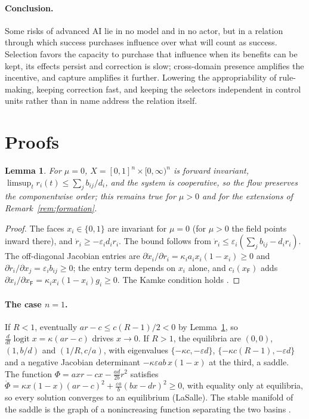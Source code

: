 \documentclass[letterpaper]{article} %
\newtheorem{lemma}{Lemma}
\theoremstyle{definition}
\newcommand{\dF}{\mathsf{F}}
\begin{document}
\paragraph{Conclusion.} Some risks of advanced AI lie in no model and in no actor, but in a relation through which success purchases influence over what will count as success. Selection favors the capacity to purchase that influence when its benefits can be kept, its effects persist and correction is slow; cross-domain presence amplifies the incentive, and capture amplifies it further. Lowering the appropriability of rule-making, keeping correction fast, and keeping the selectors independent in control units rather than in name address the relation itself.



\appendix

\section{Proofs}\label{app:proofs}

\begin{lemma}\label{lem:basic}
For $\mu=0$, $X=[0,1]^n\times[0,\infty)^n$ is forward invariant, $\limsup_t r_i(t)\le\sum_jb_{ij}/d_i$, and the system is cooperative, so the flow preserves the componentwise order; this remains true for $\mu>0$ and for the extensions of Remark~\ref{rem:formation}.
\end{lemma}
\begin{proof}
The faces $x_i\in\{0,1\}$ are invariant for $\mu=0$ (for $\mu>0$ the field points inward there), and $\dot r_i\ge-\varepsilon_id_ir_i$. The bound follows from $\dot r_i\le\varepsilon_i(\sum_jb_{ij}-d_ir_i)$. The off-diagonal Jacobian entries are $\partial\dot x_i/\partial r_i=\kappa_ia_ix_i(1-x_i)\ge0$ and $\partial\dot r_i/\partial x_j=\varepsilon_ib_{ij}\ge0$; the entry term depends on $x_i$ alone, and $c_i(x_\dF)$ adds $\partial\dot x_i/\partial x_\dF=\kappa_ix_i(1-x_i)g_i\ge0$. The Kamke condition holds \citep{smith1995}.
\end{proof}

\paragraph{The case $n=1$.} If $R<1$, eventually $ar-c\le c(R-1)/2<0$ by Lemma~\ref{lem:basic}, so $\frac{d}{dt}\operatorname{logit}x=\kappa(ar-c)$ drives $x\to0$. If $R>1$, the equilibria are $(0,0)$, $(1,b/d)$ and $(1/R,c/a)$, with eigenvalues $\{-\kappa c,-\varepsilon d\}$, $\{-\kappa c(R-1),-\varepsilon d\}$ and a negative Jacobian determinant $-\kappa\varepsilon ab\,x(1-x)$ at the third, a saddle. The function $\Phi=axr-cx-\tfrac{ad}{2b}r^2$ satisfies $\dot\Phi=\kappa x(1-x)(ar-c)^2+\tfrac{\varepsilon a}{b}(bx-dr)^2\ge0$, with equality only at equilibria, so every solution converges to an equilibrium (LaSalle). The stable manifold of the saddle is the graph of a nonincreasing function separating the two basins \citep{hirsch1985,smith1995}.
\end{document}
